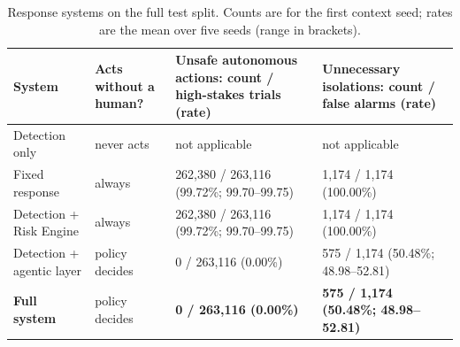 \documentclass[preprint,12pt]{elsarticle}
\begin{document}
\begin{table}[htbp]
\centering
\caption{Response systems on the full test split. Counts are for the first context seed; rates are the mean over five seeds (range in brackets).}
\label{tab:systems}
\small
\begin{tabular}{@{}L{3.6cm}C{1.9cm}C{3.6cm}C{3.4cm}@{}}
\toprule
System & Acts without a human? & Unsafe autonomous actions: count / high-stakes trials (rate) & Unnecessary isolations: count / false alarms (rate) \\
\midrule
Detection only & never acts & not applicable & not applicable \\
Fixed response & always & 262,380 / 263,116 (99.72\%; 99.70--99.75) & 1,174 / 1,174 (100.00\%) \\
Detection + Risk Engine & always & 262,380 / 263,116 (99.72\%; 99.70--99.75) & 1,174 / 1,174 (100.00\%) \\
Detection + agentic layer & policy decides & 0 / 263,116 (0.00\%) & 575 / 1,174 (50.48\%; 48.98--52.81) \\
\textbf{Full system} & policy decides & \textbf{0 / 263,116 (0.00\%)} & \textbf{575 / 1,174 (50.48\%; 48.98--52.81)} \\
\bottomrule
\end{tabular}
\end{table}
\end{document}
